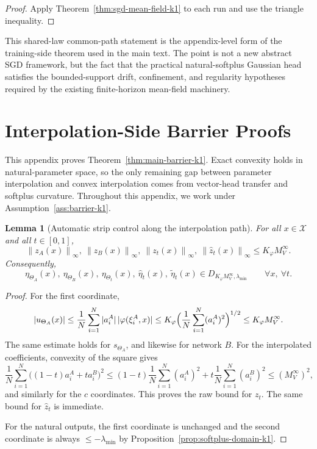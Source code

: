 \documentclass[11pt]{article}
\newtheorem{lemma}[theorem]{Lemma}
\theoremstyle{definition}
\newcommand{\norm}[1]{\left\lVert #1 \right\rVert}
\newcommand{\mc}[1]{\mathcal{#1}}
\begin{document}
\begin{proof}
Apply Theorem~\ref{thm:sgd-mean-field-k1} to each run and use the triangle
inequality.
\end{proof}

This shared-law common-path statement is the appendix-level form of the
training-side theorem used in the main text. The point is not a new abstract
SGD framework, but the fact that the practical natural-softplus Gaussian head
satisfies the bounded-support drift, confinement, and regularity hypotheses
required by the existing finite-horizon mean-field machinery.

\section{Interpolation-Side Barrier Proofs}

This appendix proves Theorem~\ref{thm:main-barrier-k1}. Exact convexity holds
in natural-parameter space, so the only remaining gap between parameter
interpolation and convex interpolation comes from vector-head transfer and
softplus curvature.
Throughout this appendix, we work under Assumption~\ref{ass:barrier-k1}.

\begin{lemma}[Automatic strip control along the interpolation path]
\label{lem:auto-strip-k1}
For all $x\in\mc{X}$ and all $t\in[0,1]$,
\[
  \norm{z_A(x)}_\infty,\ \norm{z_B(x)}_\infty,\ \norm{z_t(x)}_\infty,\
  \norm{\hat z_t(x)}_\infty
  \le
  K_\varphi M_V^\infty.
\]
Consequently,
\[
  \eta_{\Theta_A}(x),\ \eta_{\Theta_B}(x),\ \eta_{\Theta_t}(x),\
  \hat\eta_t(x),\ \tilde\eta_t(x)
  \in
  D_{K_\varphi M_V^\infty,\lambda_{\min}}
  \qquad
  \forall x,\ \forall t.
\]
\end{lemma}

\begin{proof}
For the first coordinate,
\[
  |u_{\Theta_A}(x)|
  \le
  \frac1N\sum_{i=1}^N |a_i^A|\,|\varphi(\xi_i^A,x)|
  \le
  K_\varphi
  \Bigl(\frac1N\sum_{i=1}^N (a_i^A)^2\Bigr)^{1/2}
  \le
  K_\varphi M_V^\infty.
\]
The same estimate holds for $s_{\Theta_A}$, and likewise for network $B$.
For the interpolated coefficients, convexity of the square gives
\[
  \frac1N\sum_{i=1}^N \bigl((1-t)a_i^A+ta_i^B\bigr)^2
  \le
  (1-t)\frac1N\sum_{i=1}^N (a_i^A)^2
  +
  t\frac1N\sum_{i=1}^N (a_i^B)^2
  \le
  (M_V^\infty)^2,
\]
and similarly for the $c$ coordinates. This proves the raw bound for $z_t$.
The same bound for $\hat z_t$ is immediate.

For the natural outputs, the first coordinate is unchanged and the second
coordinate is always $\le -\lambda_{\min}$ by
Proposition~\ref{prop:softplus-domain-k1}.
\end{proof}
\end{document}
